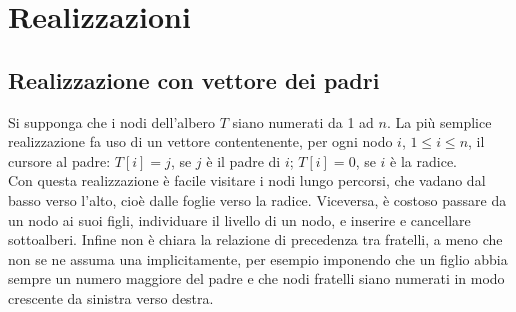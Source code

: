 \documentclass[12pt]{report}
\begin{document}
  \section{Realizzazioni}
  \subsection{Realizzazione con vettore dei padri}
  Si supponga che i nodi dell'albero $T$ siano numerati da 1 ad $n$. La più semplice realizzazione fa uso di un vettore contentenente, per ogni nodo $i$, $1 \leq i \leq n$, il cursore al padre: $T[i] = j$, se $j$ è il padre di $i$; $T[i] = 0$, se $i$ è la radice. \\
  Con questa realizzazione è facile visitare i nodi lungo percorsi, che vadano dal basso verso l'alto, cioè dalle foglie verso la radice. Viceversa, è costoso passare da un nodo ai suoi figli, individuare il livello di un nodo, e inserire e cancellare sottoalberi. Infine non è chiara la relazione di precedenza tra fratelli, a meno che non se ne assuma una implicitamente,  per esempio imponendo che un figlio abbia sempre un numero maggiore del padre e che nodi fratelli siano numerati in modo crescente da sinistra verso destra. \\
\end{document}
